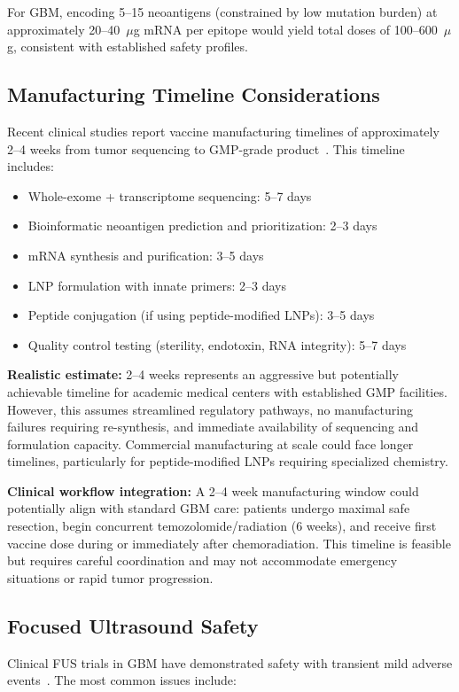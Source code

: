 \documentclass[12pt]{article}
\begin{document}
For GBM, encoding 5--15 neoantigens (constrained by low mutation burden) at approximately 20--40~$\mu$g mRNA per epitope would yield total doses of 100--600~$\mu$g, consistent with established safety profiles.

\subsection{Manufacturing Timeline Considerations}
Recent clinical studies report vaccine manufacturing timelines of approximately 2--4 weeks from tumor sequencing to GMP-grade product~\citep{wang2025,hilf2024}. This timeline includes:

\begin{itemize}[leftmargin=*,noitemsep]
\item Whole-exome + transcriptome sequencing: 5--7 days
\item Bioinformatic neoantigen prediction and prioritization: 2--3 days
\item mRNA synthesis and purification: 3--5 days
\item LNP formulation with innate primers: 2--3 days
\item Peptide conjugation (if using peptide-modified LNPs): 3--5 days
\item Quality control testing (sterility, endotoxin, RNA integrity): 5--7 days
\end{itemize}

\textbf{Realistic estimate:} 2--4 weeks represents an aggressive but potentially achievable timeline for academic medical centers with established GMP facilities. However, this assumes streamlined regulatory pathways, no manufacturing failures requiring re-synthesis, and immediate availability of sequencing and formulation capacity. Commercial manufacturing at scale could face longer timelines, particularly for peptide-modified LNPs requiring specialized chemistry.

\textbf{Clinical workflow integration:} A 2--4 week manufacturing window could potentially align with standard GBM care: patients undergo maximal safe resection, begin concurrent temozolomide/radiation (6 weeks), and receive first vaccine dose during or immediately after chemoradiation. This timeline is feasible but requires careful coordination and may not accommodate emergency situations or rapid tumor progression.

\subsection{Focused Ultrasound Safety}
Clinical FUS trials in GBM have demonstrated safety with transient mild adverse events~\citep{chen2024fus,manfredi2024}. The most common issues include:
\end{document}
